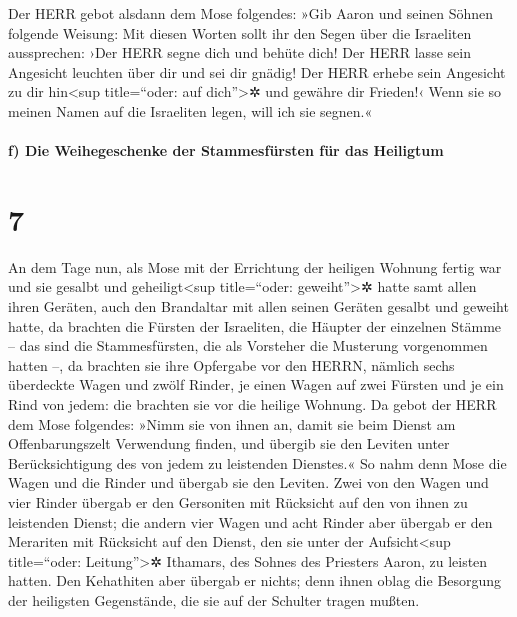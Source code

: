 Der HERR gebot alsdann dem Mose folgendes:
»Gib Aaron und seinen Söhnen folgende Weisung: Mit diesen
Worten sollt ihr den Segen über die Israeliten aussprechen:
›Der HERR segne dich und behüte dich! Der
HERR lasse sein Angesicht leuchten über dir und sei dir gnädig!
Der HERR erhebe sein Angesicht zu dir hin\textless sup
title=``oder: auf dich''\textgreater✲ und gewähre dir Frieden!‹
Wenn sie so meinen Namen auf die Israeliten legen, will
ich sie segnen.«

\hypertarget{f-die-weihegeschenke-der-stammesfuxfcrsten-fuxfcr-das-heiligtum}{%
\paragraph{f) Die Weihegeschenke der Stammesfürsten für das
Heiligtum}\label{f-die-weihegeschenke-der-stammesfuxfcrsten-fuxfcr-das-heiligtum}}

\hypertarget{section-6}{%
\section{7}\label{section-6}}

An dem Tage nun, als Mose mit der Errichtung der heiligen
Wohnung fertig war und sie gesalbt und geheiligt\textless sup
title=``oder: geweiht''\textgreater✲ hatte samt allen ihren Geräten,
auch den Brandaltar mit allen seinen Geräten gesalbt und geweiht hatte,
da brachten die Fürsten der Israeliten, die Häupter der
einzelnen Stämme -- das sind die Stammesfürsten, die als Vorsteher die
Musterung vorgenommen hatten --, da brachten sie ihre
Opfergabe vor den HERRN, nämlich sechs überdeckte Wagen und zwölf
Rinder, je einen Wagen auf zwei Fürsten und je ein Rind von jedem: die
brachten sie vor die heilige Wohnung. Da gebot der HERR
dem Mose folgendes: »Nimm sie von ihnen an, damit sie beim
Dienst am Offenbarungszelt Verwendung finden, und übergib sie den
Leviten unter Berücksichtigung des von jedem zu leistenden Dienstes.«
So nahm denn Mose die Wagen und die Rinder und übergab sie
den Leviten. Zwei von den Wagen und vier Rinder übergab er
den Gersoniten mit Rücksicht auf den von ihnen zu leistenden Dienst;
die andern vier Wagen und acht Rinder aber übergab er den
Merariten mit Rücksicht auf den Dienst, den sie unter der
Aufsicht\textless sup title=``oder: Leitung''\textgreater✲ Ithamars, des
Sohnes des Priesters Aaron, zu leisten hatten. Den
Kehathiten aber übergab er nichts; denn ihnen oblag die Besorgung der
heiligsten Gegenstände, die sie auf der Schulter tragen mußten.

